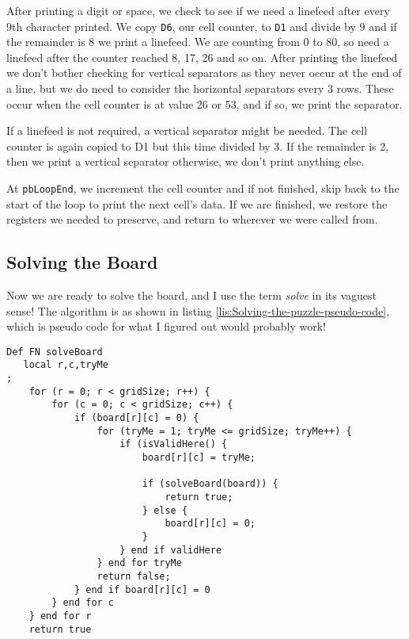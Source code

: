 

After printing a digit or space, we check to see if we need a linefeed
after every 9th character printed. We copy \texttt{D6}, our cell counter,
to \texttt{D1} and divide by 9 and if the remainder is 8 we print
a linefeed. We are counting from 0 to 80, so need a linefeed after
the counter reached 8, 17, 26 and so on. After printing the linefeed
we don't bother checking for vertical separators as they never occur
at the end of a line, but we do need to consider the horizontal separators
every 3 rows. These occur when the cell counter is at value 26 or
53, and if so, we print the separator.

If a linefeed is not required, a vertical separator might be needed.
The cell counter is again copied to D1 but this time divided by 3.
If the remainder is 2, then we print a vertical separator otherwise,
we don't print anything else.

At \texttt{pbLoopEnd}, we increment the cell counter and if not finished,
skip back to the start of the loop to print the next cell's data.
If we are finished, we restore the registers we needed to preserve,
and return to wherever we were called from.

\subsection{Solving the Board}

Now we are ready to solve the board, and I use the term \emph{solve}
in its vaguest sense! The algorithm is as shown in listing \ref{lis:Solving-the-puzzle-pseudo-code},
which is pseudo code for what I figured out would probably work!

\begin{lstlisting}[caption={Solving the Puzzle Pseudo Code},label={lis:Solving-the-puzzle-pseudo-code},language={[Visual]Basic},showstringspaces=false,tabsize=4]
Def FN solveBoard
   local r,c,tryMe
;
    for (r = 0; r < gridSize; r++) {
        for (c = 0; c < gridSize; c++) {
            if (board[r][c] = 0) {
                for (tryMe = 1; tryMe <= gridSize; tryMe++) {
                    if (isValidHere() {
                        board[r][c] = tryMe;

                        if (solveBoard(board)) {
                            return true;
                        } else {
                            board[r][c] = 0;
                        }
                    } end if validHere
                } end for tryMe
                return false;
            } end if board[r][c] = 0
        } end for c
    } end for r
    return true

\end{lstlisting}

